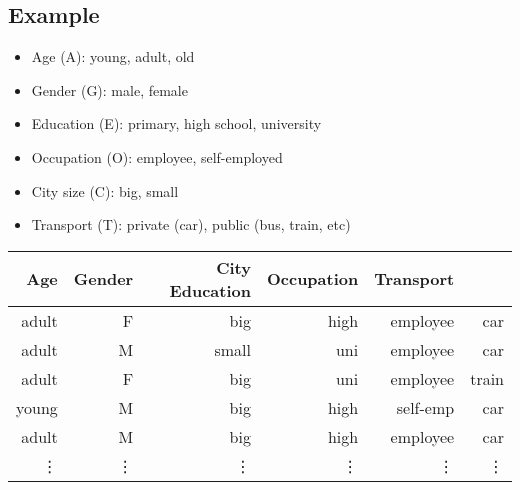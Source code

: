 \subsection{Example}
	\begin{frame}
		\begin{itemize}
			\item Age (A): young, adult, old
			\item Gender (G): male, female
			\item Education (E): primary, high school, university
			\item Occupation (O): employee, self-employed
			\item City size (C): big, small
			\item Transport (T): private (car), public (bus, train, etc)
		\end{itemize}
	\end{frame}
	\begin{frame}
		\begin{tabular}{ r r r r r r }
			\hline
			Age & Gender & City Education & Occupation & Transport \\ \hline
			adult & F & big & high & employee & car \\
			adult & M & small & uni & employee & car \\
			adult & F & big & uni & employee & train \\
			young & M & big & high & self-emp & car \\
			adult & M & big & high & employee & car \\
			\vdots & \vdots & \vdots & \vdots & \vdots & \vdots \\ \hline
		\end{tabular}
	\end{frame}